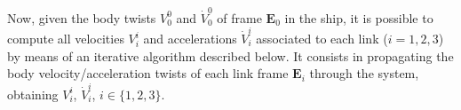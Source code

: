 %
Now, given the body twists $V^0_{0}$ and $\dot{V}^0_{0}$ of frame $\mathbf{E}_0$ in the ship, it is possible to compute all velocities $V^i_{i}$ and accelerations $\dot{V}^i_{i}$ associated to each link ($i=1,2,3$) by means of an iterative algorithm described below. It consists in propagating the body velocity/acceleration twists of each link frame $\mathbf{E}_{i}$ through the system, obtaining $V^{i}_{i}$, $\dot{V}^{i}_{i}$, $i \in \{1,2,3\}$.

